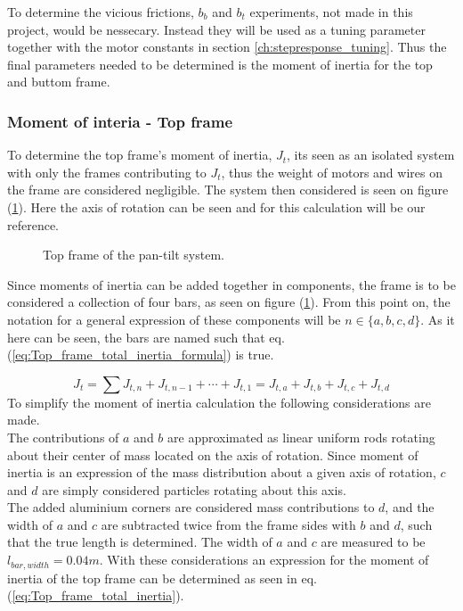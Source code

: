 \documentclass[../../main]{subfiles}
\begin{document}
To determine the vicious frictions, $b_b$ and $b_t$ experiments, not made in this project, would be nessecary. Instead they will be used as a tuning parameter together with the motor constants in section \ref{ch:stepresponse_tuning}. Thus the final parameters needed to be determined is the moment of inertia for the top and buttom frame.

\subsubsection{Moment of interia - Top frame}
\label{ch:Top_frame_inertia}
To determine the top frame's moment of inertia, $J_{t}$, its seen as an isolated system with only the frames contributing to $J_{t}$, thus the weight of motors and wires on the frame are considered negligible. The system then considered is seen on figure (\ref{fig:TopFrame}). Here the axis of rotation can be seen and for this calculation will be our reference.\\

\begin{figure}[h]
  \centering
  
  \caption{Top frame of the pan-tilt system.}
  \label{fig:TopFrame}
\end{figure}

Since moments of inertia can be added together in components, the frame is to be considered a collection of four bars, as seen on figure (\ref{fig:TopFrame}). From this point on, the notation for a general expression of these components will be $n \in \{a,b,c,d\}$. As it here can be seen, the bars are named such that eq. (\ref{eq:Top_frame_total_inertia_formula}) is true.

\begin{equation}
  \label{eq:Top_frame_total_inertia_formula}
  J_t = \sum J_{t,n} + J_{t,n-1} + \dotsb + J_{t,1} = J_{t,a} + J_{t,b} + J_{t,c} + J_{t,d}
\end{equation}
To simplify the moment of inertia calculation the following considerations are made.\\
The contributions of $a$ and $b$ are approximated as linear uniform rods rotating about their center of mass located on the axis of rotation. Since moment of inertia is an expression of the mass distribution about a given axis of rotation, $c$ and $d$ are simply considered particles rotating about this axis. \\
The added aluminium corners are considered mass contributions to $d$, and the width of $a$ and $c$ are subtracted twice from the frame sides with $b$ and $d$, such that the true length is determined. The width of $a$ and $c$ are measured to be $l_{bar,width} = 0.04 \si{m}$. With these considerations an expression for the moment of inertia of the top frame can be determined as seen in eq. (\ref{eq:Top_frame_total_inertia}).
\end{document}
